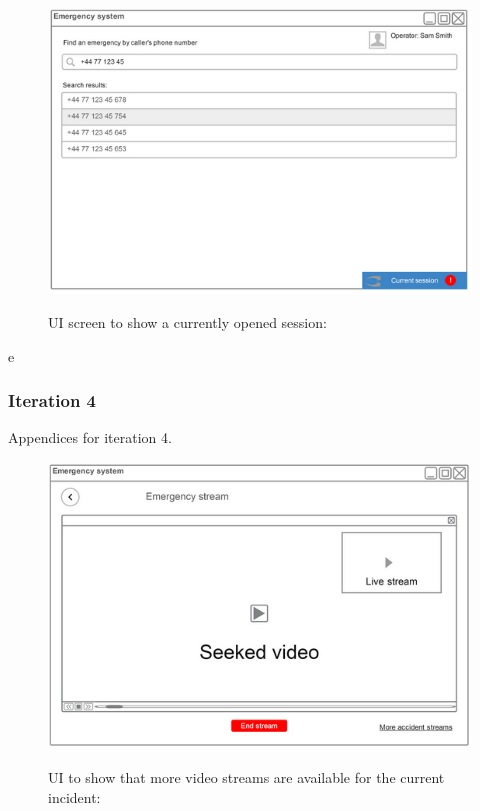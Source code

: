 \documentclass{article}
\begin{document}
    
	
	\begin{figure}[h]
		\centering
	\vspace{-10pt}
		\includegraphics[width=.8\textwidth]{"VideoStream/20"}

		UI screen to show a currently opened session:
	\vspace{-60pt}
	\end{figure} \clearpage
	
	
	e%

\subsubsection{Iteration 4} Appendices for iteration 4.    
	
    	
	\begin{figure}[h]
		\centering
		\includegraphics[width=.8\textwidth]{"VideoStream/21"}

		UI to show that more video streams are available for the current incident:
	\vspace{-5pt}
	\end{figure}
    
\end{document}
